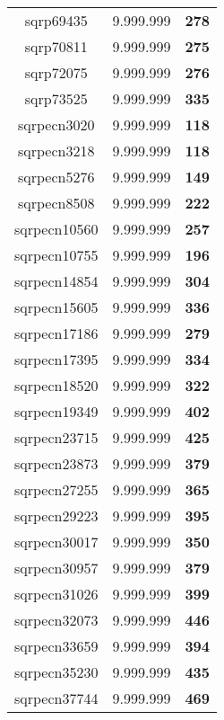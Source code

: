 \begin{tabular}{cc||c}
sqrp69435        & 9.999.999        & {\bf 278}       \\ 
sqrp70811        & 9.999.999        & {\bf 275}       \\ 
sqrp72075        & 9.999.999        & {\bf 276}       \\ 
sqrp73525        & 9.999.999        & {\bf 335}       \\ 
sqrpecn3020      & 9.999.999        & {\bf 118}       \\ 
sqrpecn3218      & 9.999.999        & {\bf 118}       \\ 
sqrpecn5276      & 9.999.999        & {\bf 149}       \\ 
sqrpecn8508      & 9.999.999        & {\bf 222}       \\ 
sqrpecn10560     & 9.999.999        & {\bf 257}       \\ 
sqrpecn10755     & 9.999.999        & {\bf 196}       \\ 
sqrpecn14854     & 9.999.999        & {\bf 304}       \\ 
sqrpecn15605     & 9.999.999        & {\bf 336}       \\ 
sqrpecn17186     & 9.999.999        & {\bf 279}       \\ 
sqrpecn17395     & 9.999.999        & {\bf 334}       \\ 
sqrpecn18520     & 9.999.999        & {\bf 322}       \\ 
sqrpecn19349     & 9.999.999        & {\bf 402}       \\ 
sqrpecn23715     & 9.999.999        & {\bf 425}       \\ 
sqrpecn23873     & 9.999.999        & {\bf 379}       \\ 
sqrpecn27255     & 9.999.999        & {\bf 365}       \\ 
sqrpecn29223     & 9.999.999        & {\bf 395}       \\ 
sqrpecn30017     & 9.999.999        & {\bf 350}       \\ 
sqrpecn30957     & 9.999.999        & {\bf 379}       \\ 
sqrpecn31026     & 9.999.999        & {\bf 399}       \\ 
sqrpecn32073     & 9.999.999        & {\bf 446}       \\ 
sqrpecn33659     & 9.999.999        & {\bf 394}       \\ 
sqrpecn35230     & 9.999.999        & {\bf 435}       \\ 
sqrpecn37744     & 9.999.999        & {\bf 469}       \\ 

\end{tabular}
